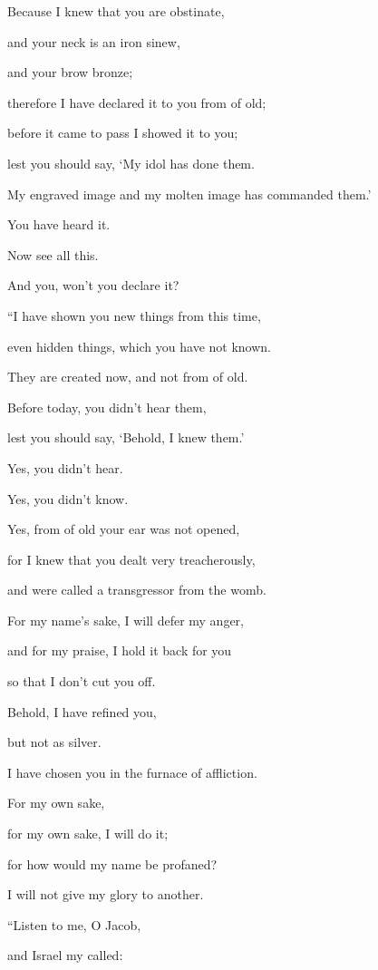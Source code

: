 \myverse{}Because I knew that you are obstinate,

and your neck is an iron sinew,

and your brow bronze;

\myverse{}therefore I have declared it to you from of old;

before it came to pass I showed it to you;

lest you should say, ‘My idol has done them.

My engraved image and my molten image has commanded them.’

\myverse{}You have heard it.

Now see all this.

And you, won’t you declare it?

\vspace{\baselineskip} 
“I have shown you new things from this time,

even hidden things, which you have not known.

\myverse{}They are created now, and not from of old.

Before today, you didn’t hear them,

lest you should say, ‘Behold, I knew them.’

\myverse{}Yes, you didn’t hear.

Yes, you didn’t know.

Yes, from of old your ear was not opened,

for I knew that you dealt very treacherously,

and were called a transgressor from the womb.

\myverse{}For my name’s sake, I will defer my anger,

and for my praise, I hold it back for you

so that I don’t cut you off.

\myverse{}Behold, I have refined you,

but not as silver.

I have chosen you in the furnace of affliction.

\myverse{}For my own sake,

for my own sake, I will do it;

for how would my name be profaned?

I will not give my glory to another.


\vspace{\baselineskip} \myverse{}“Listen to me, O Jacob,

and Israel my called:

